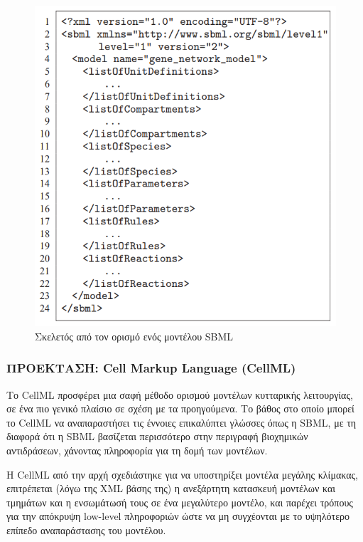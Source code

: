             \begin{figure}[ht] \noindent\centering
                \includegraphics[scale=0.7]{img/SBML skeleton}
                \caption{Σκελετός από τον ορισμό ενός μοντέλου SBML \cite{SBML}}
            \end{figure}

        \subsubsection{ΠΡΟΕΚΤΑΣΗ: Cell Markup Language (CellML)}
            Το CellML προσφέρει μια σαφή μέθοδο ορισμού μοντέλων κυτταρικής λειτουργίας, σε ένα πιο γενικό πλαίσιο σε σχέση με τα προηγούμενα. \cite{CellML}
            Το βάθος στο οποίο μπορεί το CellML να αναπαραστήσει τις έννοιες επικαλύπτει γλώσσες όπως η SBML, με τη διαφορά ότι η SBML βασίζεται περισσότερο
                στην περιγραφή βιοχημικών αντιδράσεων, χάνοντας πληροφορία για τη δομή των μοντέλων.

            Η CellML από την αρχή σχεδιάστηκε για να υποστηρίξει μοντέλα μεγάλης κλίμακας, επιτρέπεται (λόγω της XML βάσης της) η ανεξάρτητη κατασκευή μοντέλων και τμημάτων
                και η ενσωμάτωσή τους σε ένα μεγαλύτερο μοντέλο, και παρέχει τρόπους για την απόκρυψη low-level πληροφοριών ώστε να μη συγχέονται με το υψηλότερο επίπεδο αναπαράστασης του μοντέλου.

